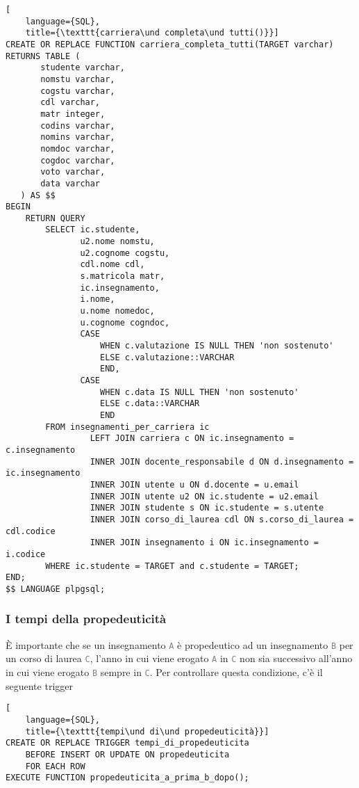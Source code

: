 \documentclass{article}
\newcommand{\attr}[1]{\texttt{\textcolor{gray}{#1}}}
\newcommand{\und}[0]{\textunderscore}
\begin{document}
\begin{lstlisting}[
    language={SQL},
    title={\texttt{carriera\und completa\und tutti()}}]
CREATE OR REPLACE FUNCTION carriera_completa_tutti(TARGET varchar) RETURNS TABLE (
       studente varchar,
       nomstu varchar,
       cogstu varchar,
       cdl varchar,
       matr integer,
       codins varchar,
       nomins varchar,
       nomdoc varchar,
       cogdoc varchar,
       voto varchar,
       data varchar
   ) AS $$
BEGIN
    RETURN QUERY
        SELECT ic.studente,
               u2.nome nomstu,
               u2.cognome cogstu,
               cdl.nome cdl,
               s.matricola matr,
               ic.insegnamento,
               i.nome,
               u.nome nomedoc,
               u.cognome cogndoc,
               CASE
                   WHEN c.valutazione IS NULL THEN 'non sostenuto'
                   ELSE c.valutazione::VARCHAR
                   END,
               CASE
                   WHEN c.data IS NULL THEN 'non sostenuto'
                   ELSE c.data::VARCHAR
                   END
        FROM insegnamenti_per_carriera ic
                 LEFT JOIN carriera c ON ic.insegnamento = c.insegnamento
                 INNER JOIN docente_responsabile d ON d.insegnamento = ic.insegnamento
                 INNER JOIN utente u ON d.docente = u.email
                 INNER JOIN utente u2 ON ic.studente = u2.email
                 INNER JOIN studente s ON ic.studente = s.utente
                 INNER JOIN corso_di_laurea cdl ON s.corso_di_laurea = cdl.codice
                 INNER JOIN insegnamento i ON ic.insegnamento = i.codice
        WHERE ic.studente = TARGET and c.studente = TARGET;
END;
$$ LANGUAGE plpgsql;
\end{lstlisting}

\subsubsection{I tempi della propedeuticità}
È importante che se un insegnamento \attr{A} è propedeutico ad un insegnamento \attr{B} per un corso di laurea \attr{C}, l'anno in cui viene erogato \attr{A} in \attr{C} non sia successivo all'anno in cui viene erogato \attr{B} sempre in \attr{C}. Per controllare questa condizione, c'è il seguente trigger


\begin{lstlisting}[
    language={SQL},
    title={\texttt{tempi\und di\und propedeuticità}}]
CREATE OR REPLACE TRIGGER tempi_di_propedeuticita
    BEFORE INSERT OR UPDATE ON propedeuticita
    FOR EACH ROW
EXECUTE FUNCTION propedeuticita_a_prima_b_dopo();
\end{lstlisting}
\end{document}
